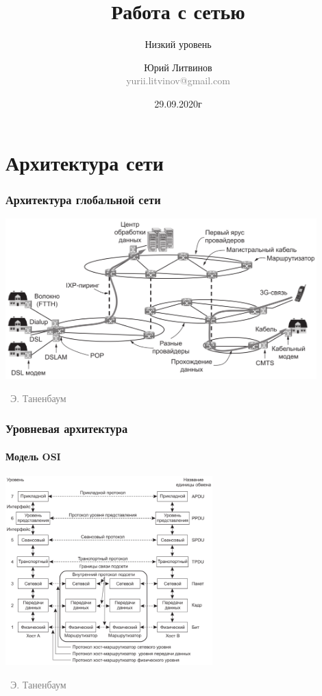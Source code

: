 \documentclass[xetex,mathserif,serif]{beamer}
\title{Работа с сетью}
\subtitle{Низкий уровень}
\author[Юрий Литвинов]{Юрий Литвинов\\\small{\textcolor{gray}{yurii.litvinov@gmail.com}}}
\date{29.09.2020г}
\newcommand{\attribution}[1] {
\vspace{-5mm}\begin{flushright}\begin{scriptsize}\textcolor{gray}{\textcopyright\, #1}\end{scriptsize}\end{flushright}
}
\begin{document}
    \frame{\titlepage}

    \section{Архитектура сети}

    \begin{frame}
        \frametitle{Архитектура глобальной сети}
        \begin{center}
            \includegraphics[width=0.9\textwidth]{internetArchitecture.png}
            \attribution{Э. Таненбаум}
        \end{center}
    \end{frame}

    \begin{frame}
        \frametitle{Уровневая архитектура}
        \framesubtitle{Модель OSI}
        \begin{center}
            \includegraphics[width=0.6\textwidth]{osiStack.png}
            \attribution{Э. Таненбаум}
        \end{center}
    \end{frame}
\end{document}
